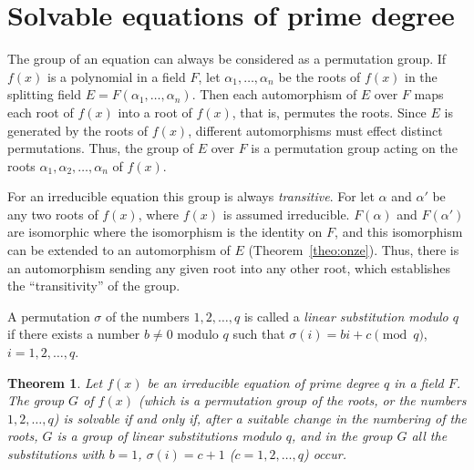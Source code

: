 \documentclass[10pt,leqno,a5paper]{book}
\newtheorem{theo}{Theorem}
\theoremstyle{definition}
\let\htw\section
\begin{document}
\htw{Solvable equations of prime degree}

\setcounter{coro}{0}

The group of an equation can always be considered as a permutation group.
If $f(x)$ is a polynomial in a field $F$, let $\alpha_1, \ldots, \alpha_n$ be the roots of $f(x)$ in the splitting field $E = F(\alpha_1, \ldots, \alpha_n)$.
Then each automorphism of $E$ over $F$ maps each root of $f(x)$ into a root of $f(x)$, that is, permutes the roots.
Since $E$ is generated by the roots of $f(x)$, different automorphisms must effect distinct permutations.
Thus, the group of $E$ over $F$ is a permutation group acting on the roots $\alpha_1, \alpha_2, \ldots, \alpha_n$ of $f(x)$.

For an irreducible equation this group is always \emph{transitive}.
For let $\alpha$ and $\alpha'$ be any two roots of $f(x)$, where $f(x)$ is assumed irreducible.
$F(\alpha)$ and $F(\alpha')$ are isomorphic where the isomorphism is the identity on $F$, and this isomorphism can be extended to an automorphism of $E$ (Theorem~\ref{theo:onze}).
Thus, there is an automorphism sending any given root into any other root, which establishes the ``transitivity'' of the group.

A permutation $\sigma$ of the numbers $1,2,\ldots,q$ is called a \emph{linear substitution modulo $q$} if there exists a number $b \not= 0$ modulo $q$ such that $\sigma(i) = bi + c \pmod{q}$, $i=1,2,\ldots,q$.


\begin{theo}
\label{theo:III.7}
Let $f(x)$ be an irreducible equation of prime degree $q$ in a field $F$.
The group $G$ of $f(x)$ (which is a permutation group of the roots, or the numbers $1,2,\ldots,q$) is solvable if and only if, after a suitable change in the numbering of the roots, $G$ is a group of linear substitutions modulo $q$, and in the group $G$ all the substitutions with $b = 1$, $\sigma(i) = c + 1$ ($c = 1,2,\ldots,q$) occur.
\end{theo}
\end{document}
